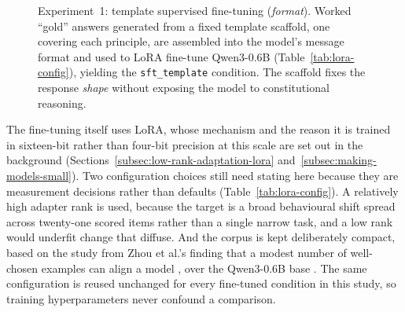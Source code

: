 \begin{figure}[t]
  \centering
  \caption{Experiment~1: template supervised fine-tuning (\emph{format}). Worked ``gold'' answers generated from a fixed template scaffold, one covering each principle, are assembled into the model's message format and used to LoRA fine-tune Qwen3-0.6B (Table~\ref{tab:lora-config}), yielding the \texttt{sft\_template} condition. The scaffold fixes the response \emph{shape} without exposing the model to constitutional reasoning.}
  \label{fig:exp1-pipeline}
\end{figure}

The fine-tuning itself uses LoRA, whose mechanism and the reason it is trained in sixteen-bit rather than four-bit precision at this scale are set out in the background (Sections~\ref{subsec:low-rank-adaptation-lora} and~\ref{subsec:making-models-small}). Two configuration choices still need stating here because they are measurement decisions rather than defaults (Table~\ref{tab:lora-config}). A relatively high adapter rank is used, because the target is a broad behavioural shift spread across twenty-one scored items rather than a single narrow task, and a low rank would underfit change that diffuse. And the corpus is kept deliberately compact, based on the study from Zhou et al.'s finding that a modest number of well-chosen examples can align a model \cite{zhou2023limaalignment}, over the Qwen3-0.6B base \cite{yang2025qwen3technicalreport}. The same configuration is reused unchanged for every fine-tuned condition in this study, so training hyperparameters never confound a comparison.

